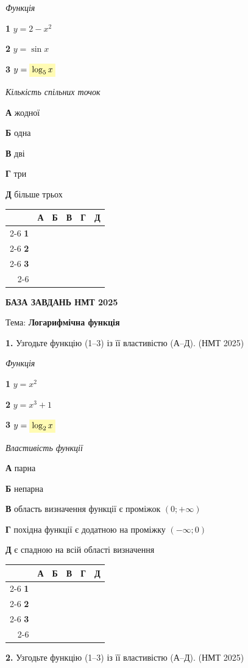 \documentclass[14pt]{extarticle}
\newcommand{\answerGridSmall}{
    \begingroup
    \renewcommand{\arraystretch}{1.2} 
    \setlength{\tabcolsep}{5pt} 
    \begin{tabular}{r|c|c|c|c|c|}
         \multicolumn{1}{c}{} & \multicolumn{1}{c}{\textbf{А}} & \multicolumn{1}{c}{\textbf{Б}} & \multicolumn{1}{c}{\textbf{В}} & \multicolumn{1}{c}{\textbf{Г}} & \multicolumn{1}{c}{\textbf{Д}} \\ \cline{2-6}
         \textbf{1} & & & & & \\ \cline{2-6}
         \textbf{2} & & & & & \\ \cline{2-6}
         \textbf{3} & & & & & \\ \cline{2-6}
    \end{tabular}
    \endgroup
}
\newcommand{\matchingLayoutBottom}[2]{
    \noindent
    \begin{minipage}[t]{0.48\textwidth}
        #1
    \end{minipage}%
    \hfill
    \begin{minipage}[t]{0.48\textwidth}
        #2
    \end{minipage}
    
    \vspace{0.5cm}
    
    \noindent
    \answerGridSmall
}
\newcommand{\nmtyear}[1]{\hfill{\small\color{yearcolor}(НМТ #1)}}
\begin{document}
\vspace{0.3cm}

\matchingLayoutBottom{\textit{Функція}

\textbf{1} \quad $y = 2 - x^2$

\textbf{2} \quad $y = \sin x$

\textbf{3} \quad $y = \colorbox{yellow!30}{$\log_5 x$}$
}{
\textit{Кількість спільних точок}

\textbf{А} \quad жодної

\textbf{Б} \quad одна

\textbf{В} \quad дві

\textbf{Г} \quad три

\textbf{Д} \quad більше трьох
}



\newpage

\begin{center}
{\Large\textbf{\color{headerblue}БАЗА ЗАВДАНЬ НМТ 2025}}
\end{center}

\begin{center}
{\large Тема: \textbf{Логарифмічна функція}}
\end{center}

\vspace{0.5cm}

\noindent\textbf{1.} Узгодьте функцію (1--3) із її властивістю (А--Д). \nmtyear{2025}
\vspace{0.3cm}

\matchingLayoutBottom{\textit{Функція}

\textbf{1} \quad $y = x^2$

\textbf{2} \quad $y = x^3 + 1$

\textbf{3} \quad $y = \colorbox{yellow!30}{$\log_2 x$}$
}{
\textit{Властивість функції}

\textbf{А} \quad парна

\textbf{Б} \quad непарна

\textbf{В} \quad область визначення функції є проміжок $(0; +\infty)$

\textbf{Г} \quad похідна функції є додатною на проміжку $(-\infty; 0)$

\textbf{Д} \quad є спадною на всій області визначення
}

\vspace{1cm}

\noindent\textbf{2.} Узгодьте функцію (1--3) із її властивістю (А--Д). \nmtyear{2025}
\vspace{0.3cm}
\end{document}
